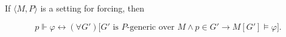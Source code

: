 If $\langle M, P \rangle$ is a setting for forcing, then

$$
p \Vdash \varphi \leftrightarrow (\forall G')\bigl[G' \text{ is } P\text{-generic over } M \land p \in G' \to M[G'] \models \varphi\bigr].
$$

